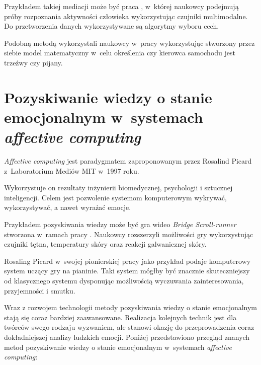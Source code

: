 Przykładem takiej mediacji może być praca \cite{zhang2011feature}, w~której naukowcy podejmują próby rozpoznania aktywności człowieka wykorzystując czujniki multimodalne. Do przetworzenia danych wykorzystywane są algorytmy wyboru cech.

Podobną metodą wykorzystali naukowcy w~pracy \cite{dai2010mobile} wykorzystując stworzony przez siebie model matematyczny w~celu określenia czy kierowca samochodu jest trzeźwy czy pijany.



\section{Pozyskiwanie wiedzy o stanie emocjonalnym w~systemach \textit{affective computing}}
\label{sec:pozyskiwanieWiedzyOStanieEmocjonalnymWSystemachAffectiveComputing}

\textit{Affective computing} jest paradygmatem zaproponowanym przez Rosalind Picard z~Laboratorium Mediów MIT w~1997 roku\cite{picard1997affective}.

Wykorzystuje on rezultaty inżynierii biomedycznej, psychologii i sztucznej inteligencji. Celem jest pozwolenie systemom komputerowym wykrywać, wykorzystywać, a nawet wyrażać emocje\cite{nalepa2017affective}.

Przykładem pozyskiwania wiedzy może być gra wideo \textit{Bridge Scroll-runner} stworzona w~ramach pracy \cite{nalepa2017affective}. Naukowcy rozszerzyli możliwości gry wykorzystując czujniki tętna, temperatury skóry oraz reakcji galwanicznej skóry.

Rosaling Picard w~swojej pionierskiej pracy \cite{picard1997affective} jako przykład podaje komputerowy system uczący gry na pianinie. Taki system mógłby być znacznie skuteczniejszy od klasycznego systemu dysponując możliwością wyczuwania zainteresowania, przyjemności i smutku.

Wraz z rozwojem technologii metody pozyskiwania wiedzy o stanie emocjonalnym stają się coraz bardziej zaawansowane. Realizacja kolejnych technik jest dla twórców swego rodzaju wyzwaniem, ale stanowi okazję do przeprowadzenia coraz dokładniejszej analizy ludzkich emocji. Poniżej przedstawiono przegląd znanych metod pozyskiwanie wiedzy o stanie emocjonalnym w~systemach \textit{affective computing}:

